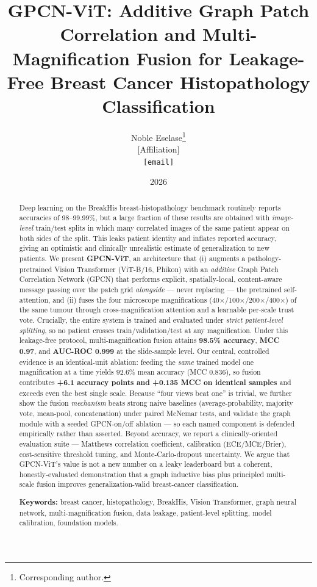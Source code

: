 \documentclass[11pt]{article}
\title{\textbf{GPCN-ViT: Additive Graph Patch Correlation and
Multi-Magnification Fusion for Leakage-Free Breast Cancer
Histopathology Classification}}
\author{%
Noble Eselase\thanks{Corresponding author.} \\
\small [Affiliation] \\
\small \texttt{[email]}
}
\date{2026}
\begin{document}
\maketitle

\begin{abstract}
\noindent
Deep learning on the BreakHis breast-histopathology benchmark routinely reports
accuracies of 98--99.99\%, but a large fraction of these results are obtained
with \emph{image-level} train/test splits in which many correlated images of the
same patient appear on both sides of the split. This leaks patient identity and
inflates reported accuracy, giving an optimistic and clinically unrealistic
estimate of generalization to new patients. We present \textbf{GPCN-ViT}, an
architecture that (i) augments a pathology-pretrained Vision Transformer
(ViT-B/16, Phikon) with an \emph{additive} Graph Patch Correlation Network (GPCN)
that performs explicit, spatially-local, content-aware message passing over the
patch grid \emph{alongside} — never replacing — the pretrained self-attention,
and (ii) fuses the four microscope magnifications (40$\times$/100$\times$/200$\times$/400$\times$)
of the same tumour through cross-magnification attention and a learnable
per-scale trust vote. Crucially, the entire system is trained and evaluated under
\emph{strict patient-level splitting}, so no patient crosses train/validation/test
at any magnification. Under this leakage-free protocol, multi-magnification fusion
attains \textbf{98.5\% accuracy}, \textbf{MCC 0.97}, and \textbf{AUC-ROC 0.999} at
the slide-sample level. Our central, controlled evidence is an identical-unit
ablation: feeding the \emph{same} trained model one magnification at a time yields
92.6\% mean accuracy (MCC 0.836), so fusion contributes \textbf{+6.1 accuracy
points and +0.135 MCC on identical samples} and exceeds even the best single
scale. Because ``four views beat one'' is trivial, we further show the fusion
\emph{mechanism} beats strong naive baselines (average-probability, majority vote,
mean-pool, concatenation) under paired McNemar tests, and validate the graph module
with a seeded GPCN-on/off ablation — so each named component is defended
empirically rather than asserted. Beyond accuracy, we report a clinically-oriented evaluation suite —
Matthews correlation coefficient, calibration (ECE/MCE/Brier), cost-sensitive
threshold tuning, and Monte-Carlo-dropout uncertainty. We argue that GPCN-ViT's
value is not a new number on a leaky leaderboard but a coherent, honestly-evaluated
demonstration that a graph inductive bias plus principled multi-scale fusion
improves generalization-valid breast-cancer classification.

\vspace{0.5em}
\noindent\textbf{Keywords:} breast cancer, histopathology, BreakHis, Vision
Transformer, graph neural network, multi-magnification fusion, data leakage,
patient-level splitting, model calibration, foundation models.
\end{abstract}
\end{document}
